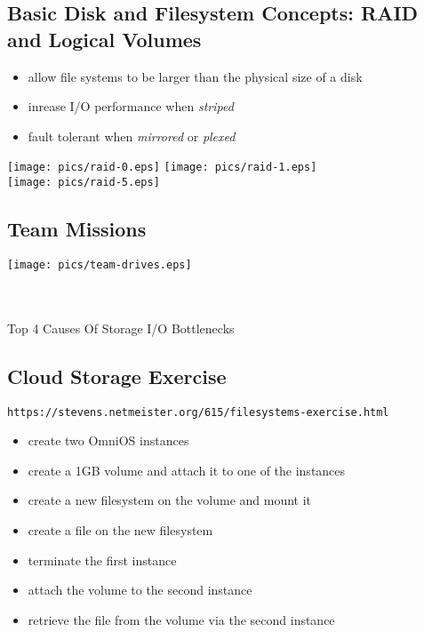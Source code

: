 \documentclass[xga]{xdvislides}
\begin{document}
\subsection{Basic Disk and Filesystem Concepts: RAID and Logical Volumes}
\begin{itemize}
	\item allow file systems to be larger than the physical size of a disk
	\item inrease I/O performance when {\em striped}
	\item fault tolerant when {\em mirrored} or {\em plexed}
\end{itemize}
\vfill
\begin{center}
        \texttt{[image: pics/raid-0.eps]}
        \hspace{.5in}
        \texttt{[image: pics/raid-1.eps]} \\
        \vspace{.2in}
        \texttt{[image: pics/raid-5.eps]}
\end{center}
\vfill

\subsection{Team Missions}
\vfill
\begin{center}
	\texttt{[image: pics/team-drives.eps]} \\
\end{center}
\vfill
\hspace*{\fill}{\bf \textcolor{green}{Green Team}} \\
\hspace*{\fill}{\tt https://is.gd/0sPSTW} \\
\hspace*{\fill}Top 4 Causes Of Storage I/O Bottlenecks

\subsection{Cloud Storage Exercise}
{\tt https://stevens.netmeister.org/615/filesystems-exercise.html}
\\

\begin{itemize}
	\item create two OmniOS instances
	\item create a 1GB volume and attach it to one of the instances
	\item create a new filesystem on the volume and mount it
	\item create a file on the new filesystem
	\item terminate the first instance
	\item attach the volume to the second instance
	\item retrieve the file from the volume via the second instance
\end{itemize}
\end{document}
